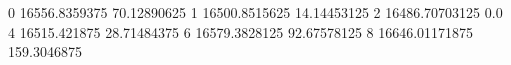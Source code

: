 0 16556.8359375 70.12890625
1 16500.8515625 14.14453125
2 16486.70703125 0.0
4 16515.421875 28.71484375
6 16579.3828125 92.67578125
8 16646.01171875 159.3046875
